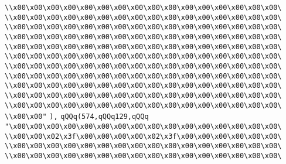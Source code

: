 \verb|\\x00\x00\x00\x00\x00\x00\x00\x00\x00\x00\x00\x00\x00\x00\x00\x00\|\newline
\verb|\\x00\x00\x00\x00\x00\x00\x00\x00\x00\x00\x00\x00\x00\x00\x00\x00\|\newline
\verb|\\x00\x00\x00\x00\x00\x00\x00\x00\x00\x00\x00\x00\x00\x00\x00\x00\|\newline
\verb|\\x00\x00\x00\x00\x00\x00\x00\x00\x00\x00\x00\x00\x00\x00\x00\x00\|\newline
\verb|\\x00\x00\x00\x00\x00\x00\x00\x00\x00\x00\x00\x00\x00\x00\x00\x00\|\newline
\verb|\\x00\x00\x00\x00\x00\x00\x00\x00\x00\x00\x00\x00\x00\x00\x00\x00\|\newline
\verb|\\x00\x00\x00\x00\x00\x00\x00\x00\x00\x00\x00\x00\x00\x00\x00\x00\|\newline
\verb|\\x00\x00\x00\x00\x00\x00\x00\x00\x00\x00\x00\x00\x00\x00\x00\x00\|\newline
\verb|\\x00\x00\x00\x00\x00\x00\x00\x00\x00\x00\x00\x00\x00\x00\x00\x00\|\newline
\verb|\\x00\x00\x00\x00\x00\x00\x00\x00\x00\x00\x00\x00\x00\x00\x00\x00\|\newline
\verb|\\x00\x00\x00\x00\x00\x00\x00\x00\x00\x00\x00\x00\x00\x00\x00\x00\|\newline
\verb|\\x00\x00"|\newline
\verb|),|\newline
\verb|qQQq(574,qQQq129,qQQq|\newline
\verb|"\x00\x00\x00\x00\x00\x00\x00\x00\x00\x00\x00\x00\x00\x00\x00\x00\|\newline
\verb|\\x00\x00\x02\x3f\x00\x00\x00\x00\x02\x3f\x00\x00\x00\x00\x00\x00\|\newline
\verb|\\x00\x00\x00\x00\x00\x00\x00\x00\x00\x00\x00\x00\x00\x00\x00\x00\|\newline
\verb|\\x00\x00\x00\x00\x00\x00\x00\x00\x00\x00\x00\x00\x00\x00\x00\x00\|\newline
